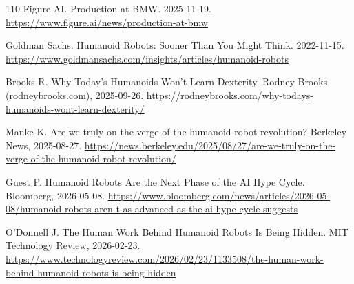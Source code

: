 \documentclass[10pt,fontset=fandol]{ctexart}
\begin{document}
\begin{thebibliography}{110}
Figure AI. Production at BMW. 2025-11-19. \url{https://www.figure.ai/news/production-at-bmw}

Goldman Sachs. Humanoid Robots: Sooner Than You Might Think. 2022-11-15. \url{https://www.goldmansachs.com/insights/articles/humanoid-robots}

Brooks R. Why Today's Humanoids Won't Learn Dexterity. Rodney Brooks (rodneybrooks.com), 2025-09-26. \url{https://rodneybrooks.com/why-todays-humanoids-wont-learn-dexterity/}

Manke K. Are we truly on the verge of the humanoid robot revolution? Berkeley News, 2025-08-27. \url{https://news.berkeley.edu/2025/08/27/are-we-truly-on-the-verge-of-the-humanoid-robot-revolution/}

Guest P. Humanoid Robots Are the Next Phase of the AI Hype Cycle. Bloomberg, 2026-05-08. \url{https://www.bloomberg.com/news/articles/2026-05-08/humanoid-robots-aren-t-as-advanced-as-the-ai-hype-cycle-suggests}

O'Donnell J. The Human Work Behind Humanoid Robots Is Being Hidden. MIT Technology Review, 2026-02-23. \url{https://www.technologyreview.com/2026/02/23/1133508/the-human-work-behind-humanoid-robots-is-being-hidden}


\end{thebibliography}
\end{document}
